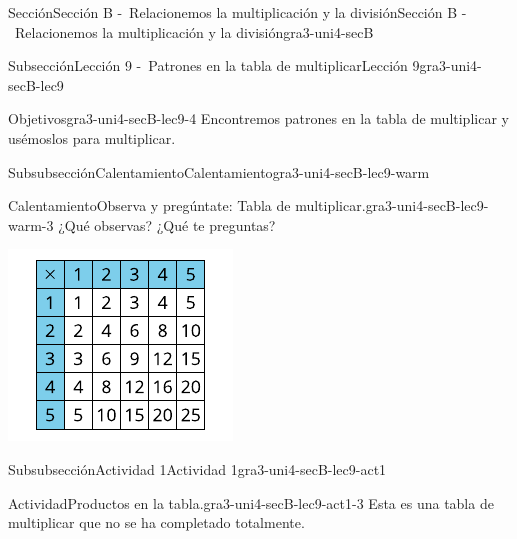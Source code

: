 \documentclass[twoside,10pt,]{article}
\begin{document}
\begin{sectionptx}{Sección}{Sección B -~Relacionemos la multiplicación y la división}{}{Sección B -~Relacionemos la multiplicación y la división}{}{}{gra3-uni4-secB}
\begin{subsectionptx}{Subsección}{Lección 9 -~Patrones en la tabla de multiplicar}{}{Lección 9}{}{}{gra3-uni4-secB-lec9}
\begin{objectives}{Objetivos}{gra3-uni4-secB-lec9-4}
Encontremos patrones en la tabla de multiplicar y usémoslos para multiplicar.%
\end{objectives}
%
%
\typeout{************************************************}
\typeout{************************************************}
%
\begin{subsubsectionptx}{Subsubsección}{Calentamiento}{}{Calentamiento}{}{}{gra3-uni4-secB-lec9-warm}
\begin{exploration}{Calentamiento}{Observa y pregúntate: Tabla de multiplicar.}{gra3-uni4-secB-lec9-warm-3}%
¿Qué observas? ¿Qué te preguntas?%
\begin{image}{0}{1}{0}{}%
\includegraphics[width=\linewidth]{external/svg-source/tikz-file-152968.pdf}
\end{image}%
\end{exploration}%
\end{subsubsectionptx}
%
%
\typeout{************************************************}
\typeout{************************************************}
%
\begin{subsubsectionptx}{Subsubsección}{Actividad 1}{}{Actividad 1}{}{}{gra3-uni4-secB-lec9-act1}
\begin{activity}{Actividad}{Productos en la tabla.}{gra3-uni4-secB-lec9-act1-3}%
Esta es una tabla de multiplicar que no se ha completado totalmente.%
\begin{image}{0}{1}{0}{}%

\end{image}
\end{activity}
\end{subsubsectionptx}
\end{subsectionptx}
\end{sectionptx}
\end{document}
